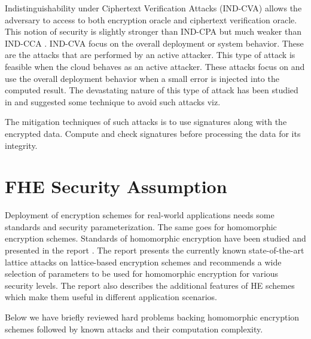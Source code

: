 Indistinguishability under Ciphertext Verification Attacks (IND-CVA) allows the adversary to access to both encryption oracle and ciphertext verification oracle. This notion of security is slightly stronger than IND-CPA but much weaker than IND-CCA \cite{hu2009ciphertext}.
IND-CVA focus on the overall deployment or system behavior. These are the attacks that are performed by an active attacker. This type of attack is feasible when the cloud behaves as an active attacker. These attacks focus on and use the overall deployment behavior when a small error is injected into the computed result. The devastating nature of this type of attack has been studied in \cite{chillotti2016attacking} and suggested some technique to avoid such attacks viz.

The mitigation techniques of such attacks is to use signatures along with the encrypted data. Compute and check signatures before processing the data for its integrity.



\section{FHE Security Assumption} Deployment of encryption schemes for real-world applications needs some standards and security parameterization. The same goes for homomorphic encryption schemes. Standards of homomorphic encryption have been studied and presented in the report \cite{albrecht2021homomorphic}. The report presents the currently known state-of-the-art lattice attacks on lattice-based encryption schemes and recommends a wide selection of parameters to be used for homomorphic encryption for various security levels. The report also describes the additional features of HE schemes which make them useful in different application scenarios.

Below we have briefly reviewed hard problems backing homomorphic encryption schemes followed by known attacks and their computation complexity.

